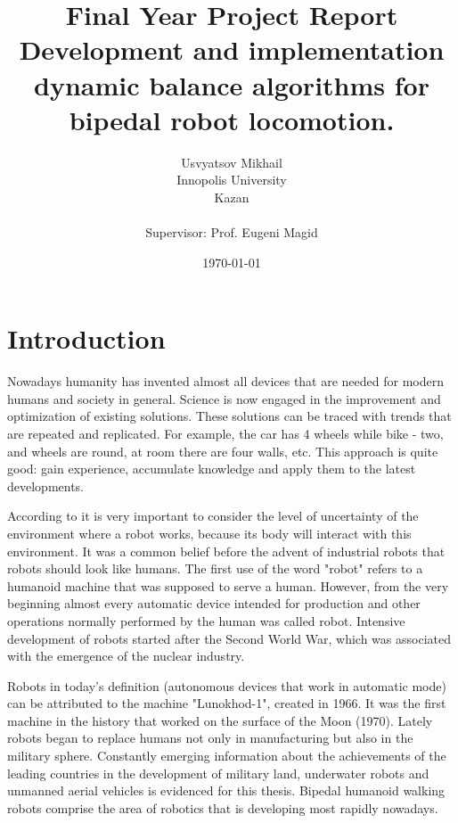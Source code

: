 \documentclass[11pt,a4paper]{report}
\begin{document}
	
	\title{Final Year Project Report\\ Development and implementation dynamic balance algorithms for bipedal robot locomotion.}
	\author{Usvyatsov Mikhail\\Innopolis University\\Kazan\\  ~\\ \normalsize Supervisor: Prof. Eugeni Magid}
	\date{\normalsize \today}
	\maketitle
	
	\tableofcontents
	
	\newpage

	\chapter{Introduction}
		Nowadays humanity has invented almost all devices that are needed for modern humans and society in general. Science is now engaged in the improvement and optimization of existing solutions. These solutions can be traced with trends that are repeated and replicated. For example, the car has 4 wheels while bike - two, and wheels are round, at room there are four walls, etc. This approach is quite good: gain experience, accumulate knowledge and apply them to the latest developments.
		
		According to \cite{pfeifer2007self} it is very important to consider the level of uncertainty of the environment where a robot works, because its body will interact with this environment. It was a common belief before the advent of industrial robots that robots should look like humans. The first use of the word "robot" refers to a humanoid machine that was supposed to serve a human. However, from the very beginning almost every automatic device intended for production and other operations normally performed by the human was called robot. Intensive development of robots started after the Second World War, which was associated with the emergence of the nuclear industry.
		
		Robots in today's definition (autonomous devices that work in automatic mode) can be attributed to the machine "Lunokhod-1", created in 1966. It was the first machine in the history that worked on the surface of the Moon (1970). Lately robots began to replace humans not only in manufacturing but also in the military sphere. Constantly emerging information about the achievements of the leading countries in the development of military land, underwater robots and unmanned aerial vehicles is evidenced for this thesis. Bipedal humanoid walking robots comprise the area of robotics that is developing most rapidly nowadays.
		
\end{document}
